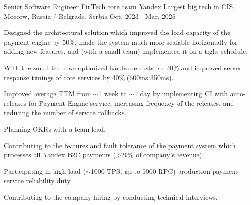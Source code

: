 \begin{cventries}
  \cventry
    {Senior Software Engineer} %
    {FinTech core team} %
    {Yandex} %
    {Largest big tech in CIS} %
    {Moscow, Russia / Belgrade, Serbia} %
    {Oct. 2023 - Mar. 2025} %
    {
      \begin{cvitemstitled} %
        \item {Designed the architectural solution which improved the load capacity of the payment engine by 50\%, made the system much more scalable horizontally for adding new features, and (with a small team) implemented it on a tight schedule.}
        \item {With the small team we optimized hardware costs for 20\% and improved server response timings of core services by 40\% (600ms \rightarrow 350ms).}
        \item {Improved average TTM from $\sim$1 week to $\sim$1 day by implementing CI with auto-releases for Payment Engine service, increasing frequency of the releases, and reducing the number of service rollbacks.}
      \end{cvitemstitled}
      \begin{cvitemstitledended}
        \item {Planning OKRs with a team lead.}
        \item {Contributing to the features and fault tolerance of the payment system which processes all Yandex B2C payments (>20\% of company's revenue).}
        \item {Participating in high load ($\sim$1000 TPS, up to 5000 RPC) production payment service reliability duty.}
        \item {Contributing to the company hiring by conducting technical interviews.}
      \end{cvitemstitledended}
    }


\end{cventries}

